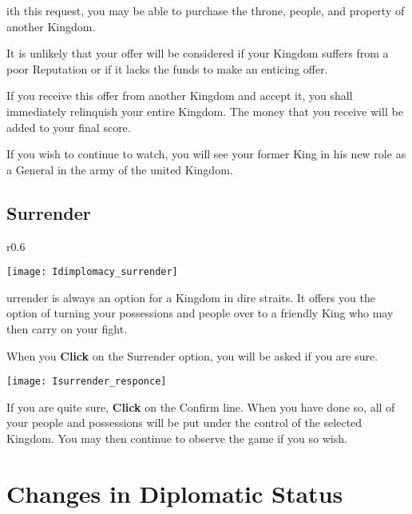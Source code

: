 
ith this request, you may be able to purchase the throne, people, and property of another Kingdom.

It is unlikely that your offer will be considered if your Kingdom suffers from a poor Reputation or if it lacks the funds to make an enticing offer.

If you receive this offer from another Kingdom and accept it, you shall immediately relinquish your entire Kingdom. The money that you receive will be added to your final score.

If you wish to continue to watch, you will see your former King in his new role as a General in the army of the united Kingdom.

\subsection{Surrender}


\begin{wrapfigure}{r}{0.6\textwidth}
    \vspace{-20pt}
    \begin{center}
        \texttt{[image: Idimplomacy\_surrender]} %
    \end{center}
    \vspace{-20pt}
\end{wrapfigure}

urrender is always an option for a Kingdom in dire straits. It offers you the option of turning your possessions and people over to a friendly King who may then carry on your fight.

When you \textbf{Click} on the Surrender option, you will be asked if you are sure.

\begin{center}
    \texttt{[image: Isurrender\_responce]} %
\end{center}

If you are quite sure, \textbf{Click} on the Confirm line. When you have done so, all of your people and possessions will be put under the control of the selected Kingdom. You may then continue to observe the game if you so wish.

\section{Changes in Diplomatic Status}

